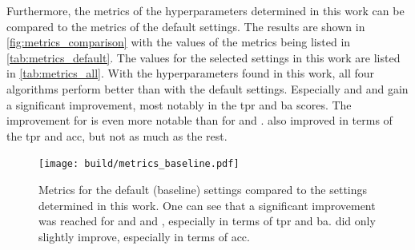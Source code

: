 Furthermore, the metrics of the hyperparameters determined in this work can be compared to the
metrics of the default settings. The results are shown in \autoref{fig:metrics_comparison} with the
values of the metrics being listed in \autoref{tab:metrics_default}. The values for the selected
settings in this work are listed in \autoref{tab:metrics_all}.
With the hyperparameters found in this work, all four algorithms perform better than with the default
settings. Especially \tcc{} and \tailcuts{} and \mars{} gain a significant improvement, most notably in the \gls{tpr} and
\gls{ba} scores. The improvement for \tcc{} is even more notable than for \mars{} and \tailcuts{}.
\fact{} also improved in terms of the \gls{tpr} and \gls{acc}, but not as much as the rest.

\begin{figure}
    \centering
    \texttt{[image: build/metrics\_baseline.pdf]}
    \caption{Metrics for the default (baseline) settings compared to the settings determined in this work.
    One can see that a significant improvement was reached for \tcc{} and \tailcuts{} and \mars{}, especially in terms of \gls{tpr} and \gls{ba}.
    \fact{} did only slightly improve, especially in terms of \gls{acc}.}%
    \label{fig:metrics_comparison}
\end{figure}

